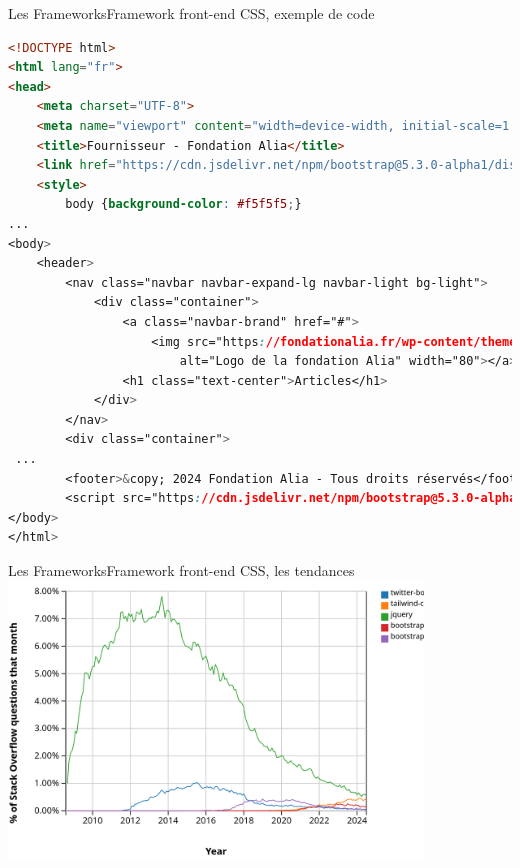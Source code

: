 \documentclass{beamer}
\begin{document}
    \begin{frame}[fragile]{Les Frameworks}{Framework front-end CSS, exemple de code}
        \begin{lstlisting}[language=HTML,basicstyle=\tiny\ttfamily]
<!DOCTYPE html>
<html lang="fr">
<head>
    <meta charset="UTF-8">
    <meta name="viewport" content="width=device-width, initial-scale=1.0">
    <title>Fournisseur - Fondation Alia</title>
    <link href="https://cdn.jsdelivr.net/npm/bootstrap@5.3.0-alpha1/dist/css/bootstrap.min.css" rel="stylesheet">
    <style>
        body {background-color: #f5f5f5;}
...
<body>
    <header>
        <nav class="navbar navbar-expand-lg navbar-light bg-light">
            <div class="container">
                <a class="navbar-brand" href="#">
                    <img src="https://fondationalia.fr/wp-content/themes/interlude-VSHA/images/Logo-header.svg"
                        alt="Logo de la fondation Alia" width="80"></a>
                <h1 class="text-center">Articles</h1>
            </div>
        </nav>
        <div class="container">
 ...
        <footer>&copy; 2024 Fondation Alia - Tous droits réservés</footer>
        <script src="https://cdn.jsdelivr.net/npm/bootstrap@5.3.0-alpha1/dist/js/bootstrap.bundle.min.js"></script>
</body>
</html>
        \end{lstlisting}
    \end{frame}

    \begin{frame}{Les Frameworks}{Framework front-end CSS, les tendances}
        \centering
        \includegraphics[width=11cm]{image/css-trends}
    \end{frame}
\end{document}

